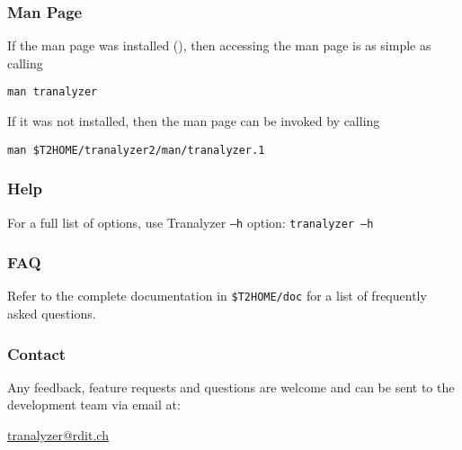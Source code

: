 \subsubsection{Man Page}
If the man page was installed (), then accessing the man page is as simple as calling
\begin{center}
    {\tt man tranalyzer}
\end{center}
If it was not installed, then the man page can be invoked by calling
\begin{center}
    {\tt man \$T2HOME/tranalyzer2/man/tranalyzer.1}
\end{center}

\subsubsection{Help}
For a full list of options, use Tranalyzer {\tt --h} option: {\tt tranalyzer --h}

\subsubsection{FAQ}
Refer to the complete documentation in {\tt \$T2HOME/doc} for a list of frequently asked questions.

\subsubsection{Contact}
Any feedback, feature requests and questions are welcome and can be sent to the development team via email at:
\begin{center}\href{mailto:tranalyzer@rdit.ch}{tranalyzer@rdit.ch}\end{center}
